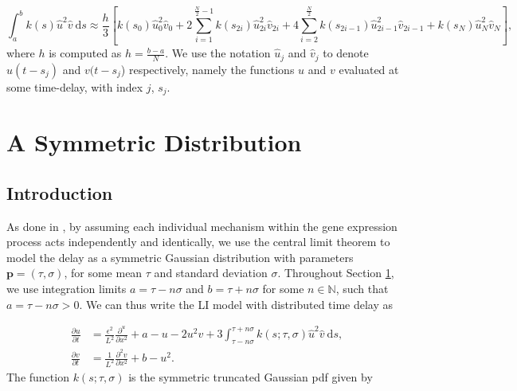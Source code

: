 \begin{equation}\label{simp}\int_{a}^{b}k(s)\hat{u}^2\hat{v}\  \text{d}s\approx\frac{h}{3}\left[k(s_0)\hat{u}^2_0\hat{v}_0+2\sum_{i=1}^{\frac{N}{2}-1}k(s_{2i})\hat{u}^2_{2i}\hat{v}_{2i}+4\sum_{i=2}^{\frac{N}{2}}k(s_{2i-1})\hat{u}^2_{2i-1}\hat{v}_{2i-1}+k(s_N)\hat{u}^2_N\hat{v}_N\right],
\end{equation}
where $h$ is computed as $h=\frac{b-a}{N}$. We use the notation $\hat{u}_j$ and $\hat{v}_j$ to denote $u(t-s_j)$ and $v(t-s_j$) respectively, namely the functions $u$ and $v$ evaluated at some time-delay, with index $j$, $s_j$.

\section{A Symmetric Distribution}\label{section:symmetric}
\subsection{Introduction}

As done in \cite{william}, by assuming each individual mechanism within the gene expression process acts independently and identically, we use the central limit theorem to model the delay as a symmetric Gaussian distribution with parameters $\textbf{p}=(\tau,\sigma)$, for some mean $\tau$ and standard deviation $\sigma$. Throughout Section \ref{section:symmetric}, we use integration limits $a=\tau-n\sigma$ and $b=\tau+n\sigma$ for some $n\in\mathbb{N}$, such that $a=\tau-n\sigma>0$. We can thus write the LI model with distributed time delay as

\begin{equation}\label{symmod}
    \begin{split}
        \frac{\partial u}{\partial t}&=\frac{\epsilon^2}{L^2}\frac{\partial^u}{\partial x^2}+a-u-2u^2v+3\int_{\tau-n\sigma}^{\tau+n\sigma}k(s;\tau,\sigma)\hat{u}^2\hat{v}\ \text{d}s,\\
        \frac{\partial v}{\partial t}&=\frac{1}{L^2}\frac{\partial^2v}{\partial x^2}+b-u^2.
    \end{split}
\end{equation}
The function $k(s;\tau,\sigma)$ is the symmetric truncated Gaussian pdf given by

